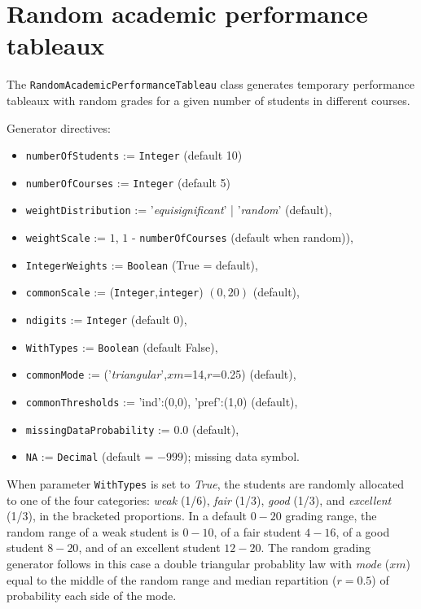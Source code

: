 \section{Random academic performance tableaux}
\label{sec:6.5}

The \texttt{RandomAcademicPerformanceTableau} class generates temporary performance tableaux with random grades for a given number of students in different courses. 

\noindent Generator directives:
\begin{itemize}
\item \texttt{numberOfStudents} := \texttt{Integer} (default 10)
\item \texttt{numberOfCourses} := \texttt{Integer} (default 5)
\item \texttt{weightDistribution} := '\emph{equisignificant}' | '\emph{random}' (default),
\item \texttt{weightScale} := $1$, $1$ - \texttt{numberOfCourses} (default when random)),
\item \texttt{IntegerWeights} := \texttt{Boolean} (True = default),
\item \texttt{commonScale} := (\texttt{Integer},\texttt{integer}) $(0,20)$ (default),
\item \texttt{ndigits} := \texttt{Integer} (default 0),
\item \texttt{WithTypes} := \texttt{Boolean} (default False),
\item \texttt{commonMode} := ('\emph{triangular}',$xm$=14,$r$=0.25) (default),
\item \texttt{commonThresholds} := {'ind':(0,0), 'pref':(1,0)} (default),
\item \texttt{missingDataProbability} := 0.0 (default),
\item \texttt{NA} := \texttt{Decimal} (default = $-999$); missing data symbol. 
\end{itemize}      

When parameter \texttt{WithTypes} is set to \emph{True}, the students are randomly allocated to one of the four categories: \emph{weak} (1/6), \emph{fair} (1/3), \emph{good} (1/3), and \emph{excellent} (1/3), in the bracketed proportions. In a default $0-20$ grading range, the random range of a weak student is $0-10$, of a fair student $4-16$, of a good student $8-20$, and of an excellent student $12-20$. The random grading generator follows in this case a double triangular probablity law with \emph{mode} ($xm$) equal to the middle of the random range and median repartition ($r = 0.5$) of probability each side of the mode.


